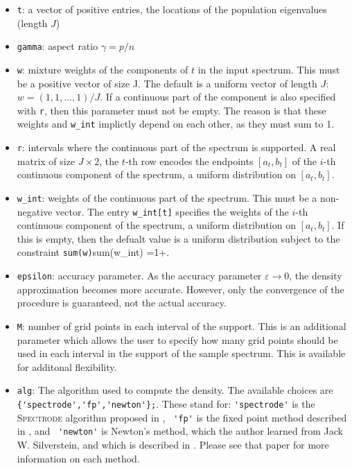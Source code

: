 \documentclass[english,11pt]{article} %
\begin{document}
\begin{itemize}
\item \verb+t+:  a vector of positive entries, the locations of the population eigenvalues (length $J$)
\item \verb+gamma+:  aspect ratio $\gamma = p/n$
\item \verb+w+: mixture weights of the components of $t$ in the input spectrum. This must be a positive vector of size J. The default is a uniform vector of length $J$: $w = (1,1,\ldots,1)/J$. If a continuous part of the component is also specified with \verb+r+, then this parameter must not be empty. The reason is that these weights and \verb+w_int+ implictly depend on each other, as they must sum to 1.

\item \verb+r+: intervals where the continuous part of the spectrum is supported.
       A real matrix of size $J \times 2$, the $t$-th row encodes the endpoints $[a_t,b_t]$ of the $i$-th continuous component of the spectrum, a uniform distribution on $[a_t,b_t]$.
\item \verb+w_int+:   weights of the continuous part of the spectrum. This must be a non-negative vector. The entry \verb+w_int[t]+ specifies the weights of the $i$-th continuous component of the spectrum, a uniform distribution on $[a_t,b_t]$. If this is empty, then the defualt value is a uniform distribution subject to the constraint \verb+sum(w)+sum(w\_int) =1+.
\item \verb+epsilon+: accuracy parameter. As the accuracy parameter $\varepsilon \to 0$, the density approximation becomes more accurate. However, only the convergence of the procedure is guaranteed, not the actual accuracy. 
\item \verb+M+:  number of grid points in each interval of the support. This is an additional parameter which allows the user to specify how many grid points should be used in each interval in the support of the sample spectrum. This is available for additonal flexibility. 
\item \verb+alg+: The algorithm used to compute the density. The available choices are \verb+ {'spectrode','fp','newton'};+. These stand for: \verb+'spectrode'+ is the \textsc{Spectrode} algorithm proposed in \cite{dobriban2015precise}, \verb+ 'fp'+ is the fixed point method described in \cite{couillet2011deterministic}, and \verb+ 'newton'+ is Newton's method, which the author learned from Jack W. Silverstein, and which is described in \cite{dobriban2015precise}. Please see that paper for more information on each method. 
\end{itemize}
\end{document}
